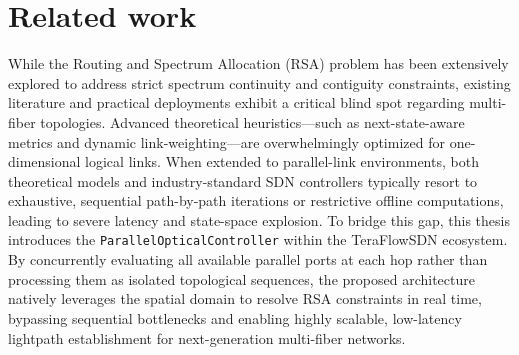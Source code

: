 \section{Related work}
While the Routing and Spectrum Allocation (RSA) problem has been extensively explored to address strict spectrum continuity and contiguity constraints, existing literature and practical deployments exhibit a critical blind spot regarding multi-fiber topologies. Advanced theoretical heuristics—such as next-state-aware metrics and dynamic link-weighting—are overwhelmingly optimized for one-dimensional logical links. When extended to parallel-link environments, both theoretical models and industry-standard SDN controllers typically resort to exhaustive, sequential path-by-path iterations or restrictive offline computations, leading to severe latency and state-space explosion. To bridge this gap, this thesis introduces the \texttt{ParallelOpticalController} within the TeraFlowSDN ecosystem. By concurrently evaluating all available parallel ports at each hop rather than processing them as isolated topological sequences, the proposed architecture natively leverages the spatial domain to resolve RSA constraints in real time, bypassing sequential bottlenecks and enabling highly scalable, low-latency lightpath establishment for next-generation multi-fiber networks.